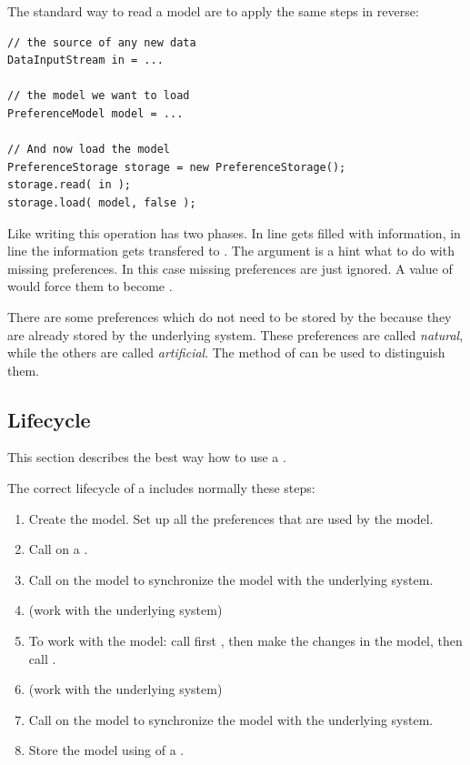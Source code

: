 The standard way to read a model are to apply the same steps in reverse:
\begin{lstlisting}
// the source of any new data
DataInputStream in = ...

// the model we want to load
PreferenceModel model = ...

// And now load the model
PreferenceStorage storage = new PreferenceStorage();
storage.read( in );
storage.load( model, false );
\end{lstlisting}
Like writing this operation has two phases. In line   gets filled with information, in line  the information gets transfered to . The argument  is a hint what to do with missing preferences. In this case missing preferences are just ignored. A value of  would force them to become .

There are some preferences which do not need to be stored by the \linebreak {} because they are already stored by the underlying system. These preferences are called \textit{natural}, while the others are called \textit{artificial}. The method  of  can be used to distinguish them.


\subsection{Lifecycle}
This section describes the best way how to use a .

The correct lifecycle of a  includes normally these steps:
\begin{enumerate}
 \item Create the model. Set up all the preferences that are used by the model.
 \item Call  on a .
 \item Call  on the model to synchronize the model with the underlying system.
 \item (work with the underlying system)
 \item To work with the model: call first , then make the changes in the model, then call .
 \item (work with the underlying system)
 \item Call  on the model to synchronize the model with the underlying system.
 \item Store the model using  of a .
\end{enumerate}

